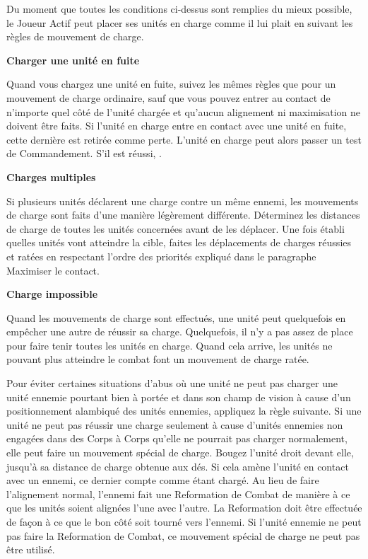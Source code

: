 Du moment que toutes les conditions ci-dessus sont remplies du mieux possible, le Joueur Actif peut placer ses unités en charge comme il lui plait en suivant les règles de mouvement de charge.


\noindent\textbf{Charger une unité en fuite}

Quand vous chargez une unité en fuite, suivez les mêmes règles que pour un mouvement de charge ordinaire, sauf que vous pouvez entrer au contact de n'importe quel côté de l'unité chargée et qu'aucun alignement ni maximisation ne doivent être faits. Si l'unité en charge entre en contact avec une unité en fuite, cette dernière est retirée comme perte. L'unité en charge peut alors passer un test de Commandement. S'il est réussi, .

\noindent\textbf{Charges multiples}

Si plusieurs unités déclarent une charge contre un même ennemi, les mouvements de charge sont faits d'une manière légèrement différente. Déterminez les distances de charge de toutes les unités concernées avant de les déplacer. Une fois établi quelles unités vont atteindre la cible, faites les déplacements de charges réussies et ratées en respectant l'ordre des priorités expliqué dans le paragraphe Maximiser le contact.

\noindent\textbf{Charge impossible}

Quand les mouvements de charge sont effectués, une unité peut quelquefois en empêcher une autre de réussir sa charge. Quelquefois, il n'y a pas assez de place pour faire tenir toutes les unités en charge. Quand cela arrive, les unités ne pouvant plus atteindre le combat font un mouvement de charge ratée.

\noindent\textbf{}

Pour éviter certaines situations d'abus où une unité ne peut pas charger une unité ennemie pourtant bien à portée et dans son champ de vision à cause d'un positionnement alambiqué des unités ennemies, appliquez la règle suivante. Si une unité ne peut pas réussir une charge seulement à cause d'unités ennemies non engagées dans des Corps à Corps qu'elle ne pourrait pas charger normalement, elle peut faire un mouvement spécial de charge. Bougez l'unité droit devant elle, jusqu'à sa distance de charge obtenue aux dés. Si cela amène l'unité en contact avec un ennemi, ce dernier compte comme étant chargé. Au lieu de faire l'alignement normal, l'ennemi fait une Reformation de Combat de manière à ce que les unités soient alignées l'une avec l'autre. La Reformation doit être effectuée de façon à ce que le bon côté soit tourné vers l'ennemi. Si l'unité ennemie ne peut pas faire la Reformation de Combat, ce mouvement spécial de charge ne peut pas être utilisé.


